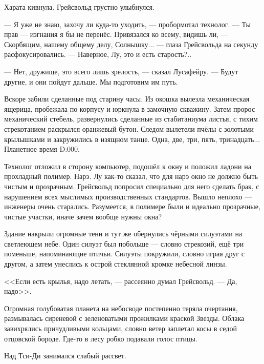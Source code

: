 Харата кивнула.
Грейсвольд грустно улыбнулся.

--- Я уже не знаю, захочу ли куда-то уходить, --- пробормотал технолог.
--- Ты прав --- изгнания я бы не перенёс.
Привязался ко всему, видишь ли, --- Скорбящим, нашему общему делу, Солнышку... --- глаза Грейсвольда на секунду расфокусировались.
--- Наверное, Лу, это и есть старость?..

--- Нет, дружище, это всего лишь зрелость, --- сказал Лусафейру.
--- Будут другие, и они пойдут дальше.
Мы подготовим им путь.

Вскоре забили сделанные под старину часы.
Из окошка вылезла механическая ящерица, пробежала по корпусу и юркнула в замочную скважину.
Затем пророс механический стебель, развернулись сделанные из стабитаниума листья, с тихим стрекотанием раскрылся оранжевый бутон.
Следом вылетели пчёлы с золотыми крылышками и закружились в изящном танце.
Одна, две, три, пять, тринадцать...
Планетное время D:000.

Технолог отложил в сторону компьютер, подошёл к окну и положил ладони на прохладный полимер.
Нарэ.
Лу как-то сказал, что для нарэ окно не должно быть чистым и прозрачным.
Грейсвольд попросил специально для него сделать брак, с нарушением всех мыслимых производственных стандартов.
Вышло неплохо --- инженеры очень старались.
Разумеется, в полимере были и идеально прозрачные, чистые участки, иначе зачем вообще нужны окна?

Здание накрыли огромные тени и тут же обернулись чёрными силуэтами на светлеющем небе.
Один силуэт был побольше --- словно стрекозий, ещё три поменьше, напоминающие птичьи.
Силуэты покружили, словно играя друг с другом, а затем унеслись к острой стеклянной кромке небесной линзы.

<<Если есть крылья, надо летать, --- рассеянно думал Грейсвольд.
--- Да, надо>>.

Огромная голубоватая планета на небосводе постепенно теряла очертания, размывалась сиреневой с зеленоватыми прожилками краской Звезды.
Облака завихрялись причудливыми кольцами, словно ветер заплетал косы в седой отцовской бороде.
Где-то в лесу робко подавали голос птицы.

Над Тси-Ди занимался слабый рассвет.

